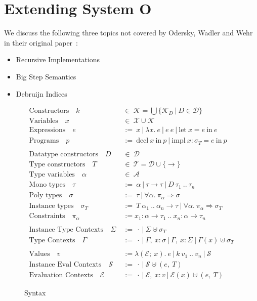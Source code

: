 \documentclass[runningheads]{llncs}
\begin{document}
\section{Extending System O}
We discuss the following three topics not covered by Odersky, Wadler and Wehr in their original paper~\cite{system-o}:
\begin{itemize}
  \item Recursive Implementations
  \item Big Step Semantics
  \item Debruijn Indices
\end{itemize}
\begin{figure}
  \begin{align*}
    \text{Constructors} \quad k \ &\in \ \mathcal{K} = \bigcup\{\mathcal{K}_D \ | \ D \in \mathcal{D}\} \\
    \text{Variables} \quad x \ &\in \ \mathcal{X} \cup \mathcal{K} \\
    \text{Expressions} \quad e \ &:= \ x \ | \ \lambda x. \ e \ | \ e \ e \ | \ \text{let} \ x = e \ \text{in} \ e \\
    \text{Programs} \quad p \ &:= \ \text{decl} \ x \ \text{in} \ p \ | \ \text{impl} \ x :  \sigma_T  = e \ \text{in} \ p \\
    \\
    \text{Datatype constructors} \quad D \ &\in \ \mathcal{D} \\
    \text{Type constructors} \quad T \ &\in \ \mathcal{T} = \mathcal{D} \cup \{\rightarrow\} \\ 
    \text{Type variables} \quad \alpha \ &\in \ \mathcal{A} \\
    \text{Mono types} \quad \tau \ &:=  \ \alpha \ | \ \tau \rightarrow \tau \ | \ D \ \tau_1 \ .. \ \tau_n \\
    \text{Poly types} \quad \sigma \ &:=  \ \tau \ | \ \forall \alpha. \ \pi_\alpha \Rightarrow \sigma \\
    \text{Instance types} \quad \sigma_T \ &:= \ T \ \alpha_1 \ .. \ \alpha_n \rightarrow \tau \ | \ \forall \alpha. \ \pi_\alpha \Rightarrow \sigma_T \\  
    \text{Constraints} \quad \pi_\alpha \ &:= x_1 : \alpha \rightarrow \tau_1 \ .. \ x_n : \alpha \rightarrow \tau_n \\
    \\
    \text{Instance Type Contexts} \quad \Sigma \ &:= \ \cdot \ | \ \Sigma \uplus  \sigma_T \\
    \text{Type Contexts} \quad \Gamma \ &:= \ \cdot \ | \ \Gamma, \ x : \sigma \ | \ \Gamma, \ x : \Sigma \ | \ \Gamma(x) \uplus \sigma_T \\
    \\
    \text{Values} \quad v \ &:=  \lambda (\mathcal{E}; \ x). \ e \ | \ k \ v_1 \ .. \ v_n \ | \ \mathcal{S} \\
    \text{Instance Eval Contexts} \quad \mathcal{S} \ &:= \ \cdot \ | \ \mathcal{S} \uplus  (e ,\ T) \\
    \text{Evaluation Contexts} \quad \mathcal{E} \ &:= \ \cdot \ | \ \mathcal{E}, \ x : v  \ | \ \mathcal{E}(x) \uplus (e, \ T)
  \end{align*}
  \caption{Syntax}
\end{figure}
\end{document}
